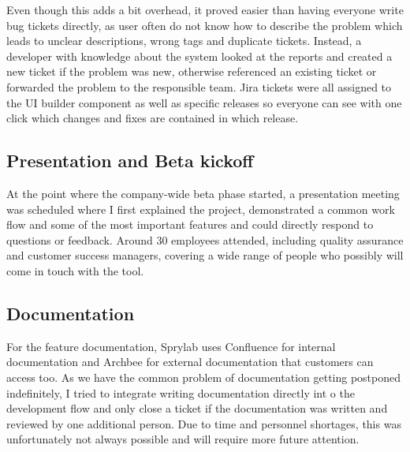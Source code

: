 Even though this adds a bit overhead, it proved easier than having everyone write bug tickets directly, as user often do not know how to describe the problem which leads to unclear descriptions, wrong tags and duplicate tickets.
Instead, a developer with knowledge about the system looked at the reports and created a new ticket if the problem was new, otherwise referenced an existing ticket or forwarded the problem to the responsible team.
Jira tickets were all assigned to the UI builder component as well as specific releases so everyone can see with one click which changes and fixes are contained in which release.

\subsection{Presentation and Beta kickoff}
At the point where the company-wide beta phase started, a presentation meeting was scheduled where I first explained the project,
demonstrated a common work flow and some of the most important features and could directly respond to questions or feedback.
Around 30 employees attended, including quality assurance and customer success managers, covering a wide range of people who possibly will come in touch with the tool.

\subsection{Documentation}
For the feature documentation, Sprylab uses Confluence for internal documentation and Archbee for external documentation that customers can access too.
As we have the common problem of documentation getting postponed indefinitely, I tried to integrate writing documentation directly int o the development flow and only close a ticket if the documentation
was written and reviewed by one additional person. Due to time and personnel shortages, this was unfortunately not always possible and will require more future attention.

